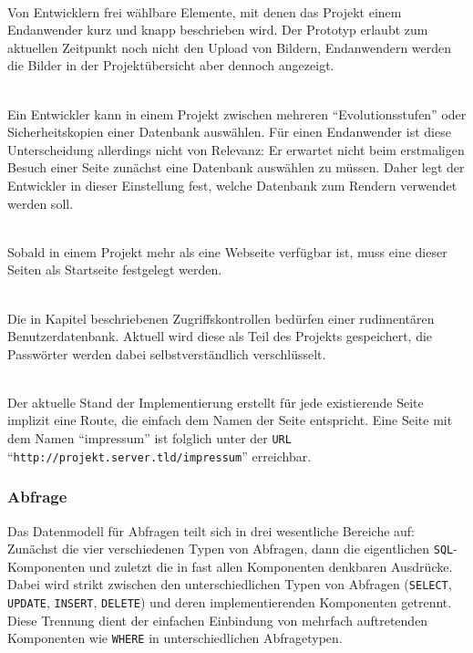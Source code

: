 \begin{description}[noitemsep]
\item[Name, Beschreibung \& Bild] \hfill \\
  Von Entwicklern frei wählbare Elemente, mit denen das Projekt einem Endanwender kurz und knapp beschrieben wird. Der Prototyp erlaubt zum aktuellen Zeitpunkt noch nicht den Upload von Bildern, Endanwendern werden die Bilder in der Projektübersicht aber dennoch angezeigt.
\item[Aktivierte Datenbank] \hfill \\
  Ein Entwickler kann in einem Projekt zwischen mehreren "`Evolutionsstufen"' oder Sicherheitskopien einer Datenbank auswählen. Für einen Endanwender ist diese Unterscheidung allerdings nicht von Relevanz: Er erwartet nicht beim erstmaligen Besuch einer Seite zunächst eine Datenbank auswählen zu müssen. Daher legt der Entwickler in dieser Einstellung fest, welche Datenbank zum Rendern verwendet werden soll.
\item[Startseite] \hfill \\
  Sobald in einem Projekt mehr als eine Webseite verfügbar ist, muss eine dieser Seiten als Startseite festgelegt werden.
\item[Benutzerdatenbank] \hfill \\
  Die in Kapitel  beschriebenen Zugriffskontrollen bedürfen einer rudimentären Benutzerdatenbank. Aktuell wird diese als Teil des Projekts gespeichert, die Passwörter werden dabei selbstverständlich verschlüsselt.
\item[Routendefinitionen] \hfill \\
  Der aktuelle Stand der Implementierung erstellt für jede existierende Seite implizit eine Route, die einfach dem Namen der Seite entspricht. Eine Seite mit dem Namen "`impressum"' ist folglich unter der \texttt{URL} "`\texttt{http://projekt.server.tld/impressum}"' erreichbar. 
\end{description}

\subsubsection{Abfrage}
\label{sec:data-model-query}

Das Datenmodell für Abfragen teilt sich in drei wesentliche Bereiche auf: Zunächst die vier verschiedenen Typen von Abfragen, dann die eigentlichen \texttt{SQL}-Komponenten und zuletzt die in fast allen Komponenten denkbaren Ausdrücke. Dabei wird strikt zwischen den unterschiedlichen Typen von Abfragen (\texttt{SELECT}, \texttt{UPDATE}, \texttt{INSERT}, \texttt{DELETE}) und deren implementierenden Komponenten getrennt. Diese Trennung dient der einfachen Einbindung von mehrfach auftretenden Komponenten wie \texttt{WHERE} in unterschiedlichen Abfragetypen.


